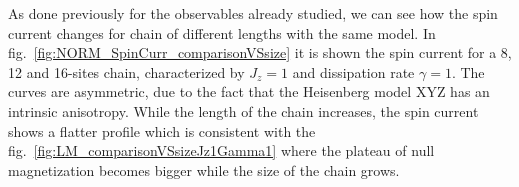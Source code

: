 


%
%
%

As done previously for the observables already studied, we can see how the spin current changes for chain of different lengths with the same model. In fig.~\ref{fig:NORM_SpinCurr_comparisonVSsize} it is shown the spin current for a 8, 12 and 16-sites chain, characterized by $J_z = 1$ and dissipation rate $\gamma = 1$. The curves are asymmetric, due to the fact that the Heisenberg model XYZ has an intrinsic anisotropy. While the length of the chain increases, the spin current shows a flatter profile which is consistent with the fig.~\ref{fig:LM_comparisonVSsizeJz1Gamma1} where the plateau of null magnetization becomes bigger while the size of the chain grows.

